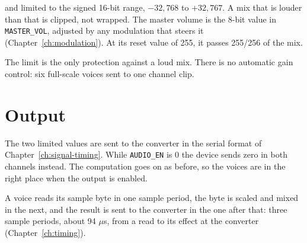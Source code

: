 \noindent and limited to the signed 16-bit range, $-32{,}768$ to $+32{,}767$. A mix that is louder than that is
clipped, not wrapped. The master volume is the 8-bit value in \texttt{MASTER\_VOL}, adjusted by any modulation that
steers it (Chapter~\ref{ch:modulation}). At its reset value of 255, it passes 255/256 of the mix.

The limit is the only protection against a loud mix. There is no automatic gain control: six full-scale voices sent to
one channel clip.

\section{Output}

The two limited values are sent to the converter in the serial format of Chapter~\ref{ch:signal-timing}. While
\texttt{AUDIO\_EN} is 0 the device sends zero in both channels instead. The computation goes on as before, so the
voices are in the right place when the output is enabled.

A voice reads its sample byte in one sample period, the byte is scaled and mixed in the next, and the result is sent to
the converter in the one after that: three sample periods, about 94 $\mu$s, from a read to its effect at the converter
(Chapter~\ref{ch:timing}).
